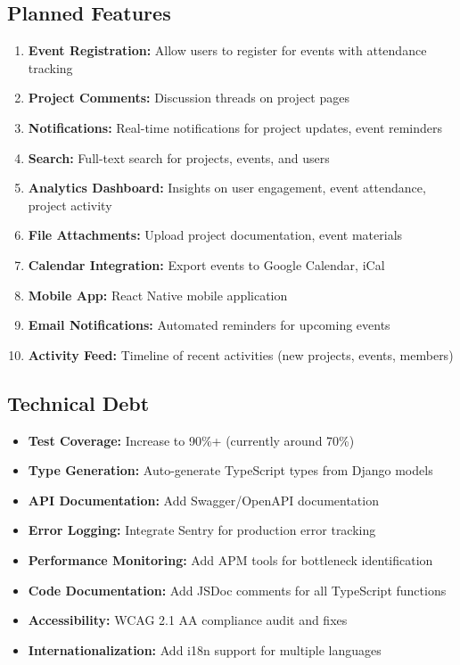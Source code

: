 \documentclass[11pt,a4paper]{article}
\begin{document}
\subsection{Planned Features}
\begin{enumerate}[leftmargin=*]
    \item \textbf{Event Registration:} Allow users to register for events with attendance tracking
    \item \textbf{Project Comments:} Discussion threads on project pages
    \item \textbf{Notifications:} Real-time notifications for project updates, event reminders
    \item \textbf{Search:} Full-text search for projects, events, and users
    \item \textbf{Analytics Dashboard:} Insights on user engagement, event attendance, project activity
    \item \textbf{File Attachments:} Upload project documentation, event materials
    \item \textbf{Calendar Integration:} Export events to Google Calendar, iCal
    \item \textbf{Mobile App:} React Native mobile application
    \item \textbf{Email Notifications:} Automated reminders for upcoming events
    \item \textbf{Activity Feed:} Timeline of recent activities (new projects, events, members)
\end{enumerate}

\subsection{Technical Debt}
\begin{itemize}[leftmargin=*]
    \item \textbf{Test Coverage:} Increase to 90\%+ (currently around 70\%)
    \item \textbf{Type Generation:} Auto-generate TypeScript types from Django models
    \item \textbf{API Documentation:} Add Swagger/OpenAPI documentation
    \item \textbf{Error Logging:} Integrate Sentry for production error tracking
    \item \textbf{Performance Monitoring:} Add APM tools for bottleneck identification
    \item \textbf{Code Documentation:} Add JSDoc comments for all TypeScript functions
    \item \textbf{Accessibility:} WCAG 2.1 AA compliance audit and fixes
    \item \textbf{Internationalization:} Add i18n support for multiple languages
\end{itemize}
\end{document}
